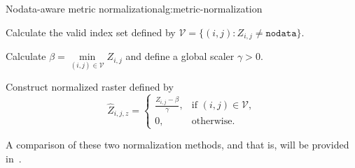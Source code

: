 \begin{algorithm}{Nodata-aware metric normalization}{alg:metric-normalization}
  \item Calculate the valid index set defined by $\mathcal{V} = \{(i, j): Z_{i,j} \neq \texttt{nodata}\}$.
  \item Calculate $\beta = \underset{(i,j) \in \mathcal{V}}{\min} Z_{i,j}$ and define a global scaler $\gamma > 0$.
  \item Construct normalized raster defined by
    \begin{equation*}
        \hat{Z}_{i,j,z} = \begin{cases}
          \frac{Z_{i,j} - \beta}{\gamma}, & \text{if } (i,j) \in \mathcal{V}, \\
          0, & \text{otherwise.}
        \end{cases}
    \end{equation*}
\end{algorithm}

A comparison of these two normalization methods,  and  that is, will be provided in~.
